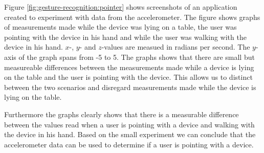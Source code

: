 Figure \ref{fig:gesture-recognition:pointer} shows screenshots of an application created to experiment with data from the accelerometer. The figure shows graphs of measurements made while the device was lying on a table, the user was pointing with the device in his hand and while the user was walking with the device in his hand. $x$-, $y$- and $z$-values are measued in radians per second. The $y$-axis of the graph spans from -5 to 5. The graphs shows that there are small but measureable differences between the measurements made while a device is lying on the table and the user is pointing with the device. This allows us to distinct between the two scenarios and disregard measurements made while the device is lying on the table.

Furthermore the graphs clearly shows that there is a measurable difference between the values read when a user is pointing with a device and walking with the device in his hand. Based on the small experiment we can conclude that the accelerometer data can be used to determine if a user is pointing with a device.

